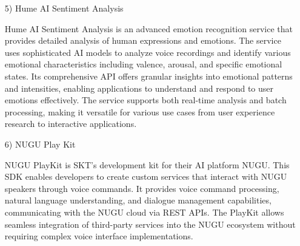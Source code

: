 \documentclass[conference]{IEEEtran}
\begin{document}
\begin{enumerate}
\begin{itemize}
        \item [5)] Hume AI Sentiment Analysis\par
        \vspace{0.3em}
        Hume AI Sentiment Analysis is an advanced emotion recognition service that provides detailed analysis of human expressions and emotions. The service uses sophisticated AI models to analyze voice recordings and identify various emotional characteristics including valence, arousal, and specific emotional states. Its comprehensive API offers granular insights into emotional patterns and intensities, enabling applications to understand and respond to user emotions effectively. The service supports both real-time analysis and batch processing, making it versatile for various use cases from user experience research to interactive applications.

        \vspace{1em}

        \item [6)] NUGU Play Kit\par
        \vspace{0.3em}
        NUGU PlayKit is SKT's development kit for their AI platform NUGU. This SDK enables developers to create custom services that interact with NUGU speakers through voice commands. It provides voice command processing, natural language understanding, and dialogue management capabilities, communicating with the NUGU cloud via REST APIs. The PlayKit allows seamless integration of third-party services into the NUGU ecosystem without requiring complex voice interface implementations.
    \end{itemize}
\end{enumerate}

\vspace{1em}
\end{document}
